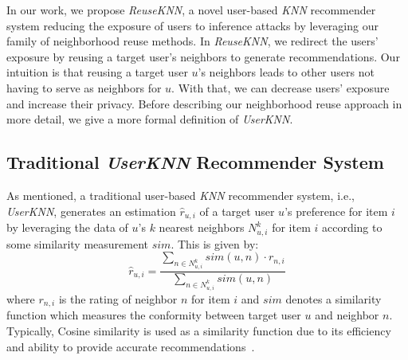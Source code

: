 \documentclass[manuscript,review,anonymous]{acmart}
\begin{document}
In our work, we propose \emph{ReuseKNN}, a novel user-based \emph{KNN} recommender system reducing the exposure of users to inference attacks by leveraging our family of neighborhood reuse methods.
In \emph{ReuseKNN}, we redirect the users' exposure by reusing a target user's neighbors to generate recommendations. 
Our intuition is that reusing a target user $u$'s neighbors leads to other users not having to serve as neighbors for $u$.
With that, we can decrease users' exposure and increase their privacy.
Before describing our neighborhood reuse approach in more detail, we give a more formal definition of \emph{UserKNN}.

\subsection{Traditional \emph{UserKNN} Recommender System}
\label{subsec:userknn}
As mentioned, a traditional user-based \emph{KNN} recommender system, i.e., \emph{UserKNN}, generates an estimation $\hat{r}_{u, i}$ of a target user $u$'s preference for item $i$ by leveraging the data of $u$'s $k$ nearest neighbors $N^k_{u, i}$ for item $i$ according to some similarity measurement $sim$. This is given by:
\begin{equation}\label{eq:knn}
    \hat{r}_{u, i} = \frac{\sum_{n \in N^k_{u, i}} sim(u, n) \cdot r_{n, i}}{\sum_{n \in N^k_{u, i}} sim(u, n)}
\end{equation}
where $r_{n, i}$ is the rating of neighbor $n$ for item $i$ and $sim$ denotes a similarity function which measures the conformity between target user $u$ and neighbor $n$.
Typically, Cosine similarity is used as a similarity function due to its efficiency and ability to provide accurate recommendations~\cite{bagchi2015performance,verma2020comparative}.
\end{document}

